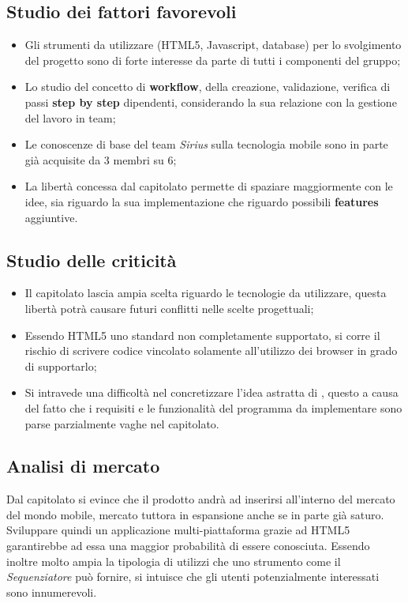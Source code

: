 \subsection{Studio dei fattori favorevoli}
\begin{itemize}
\item Gli strumenti da utilizzare (HTML5, Javascript, database) per lo svolgimento del progetto sono di forte interesse da parte di tutti i componenti del gruppo;
\item Lo studio del concetto di \textbf{workflow}, della creazione, validazione, verifica di passi \textbf{step by step} dipendenti, considerando la sua relazione con la gestione del lavoro in team;
\item Le conoscenze di base del team \textit{Sirius} sulla tecnologia mobile sono in parte già acquisite da 3 membri su 6;
\item La libertà concessa dal capitolato permette di spaziare maggiormente con le idee, sia riguardo la sua implementazione che riguardo possibili \textbf{features} aggiuntive.
\end{itemize}
\subsection{Studio delle criticità}
\begin{itemize}
\item Il capitolato lascia ampia scelta riguardo le tecnologie da utilizzare, questa libertà potrà causare futuri conflitti nelle scelte progettuali;
\item Essendo HTML5 uno standard non completamente supportato, si corre il rischio di scrivere codice vincolato solamente all'utilizzo dei browser in grado di supportarlo;
\item Si intravede una difficoltà nel concretizzare l'idea astratta di \progetto , questo a causa del fatto che i requisiti e le funzionalità del programma da implementare sono parse parzialmente vaghe nel capitolato.
\end{itemize}

\subsection{Analisi di mercato}
Dal capitolato si evince che il prodotto andrà ad inserirsi all'interno del mercato del mondo mobile, mercato tuttora in espansione anche se in parte già saturo. Sviluppare quindi un applicazione multi-piattaforma grazie ad HTML5 garantirebbe ad essa una maggior probabilità di essere conosciuta.
Essendo inoltre molto ampia la tipologia di utilizzi che uno strumento come il \textit{Sequenziatore} può fornire, si intuisce che gli utenti potenzialmente interessati sono innumerevoli.

